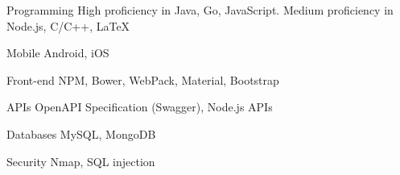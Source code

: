 

\begin{cvskills}

  \cvskill
    {Programming} %
    {High proficiency in Java, Go, JavaScript. Medium proficiency in Node.js, C/C++, \LaTeX} %

  \cvskill
    {Mobile} %
    {Android, iOS} %

  \cvskill
    {Front-end} %
    {NPM, Bower, WebPack, Material, Bootstrap} %

  \cvskill
    {APIs} %
    {OpenAPI Specification (Swagger), Node.js APIs} %

  \cvskill
    {Databases} %
    {MySQL, MongoDB} %

  \cvskill
    {Security} %
    {Nmap, SQL injection} %

\end{cvskills}